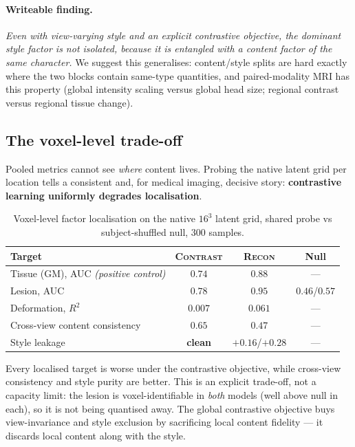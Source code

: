 \documentclass[11pt]{article}
\newcommand{\suspect}[1]{{\color{orange}#1}}
\begin{document}
\paragraph{Writeable finding.} \emph{Even with view-varying style and an explicit
contrastive objective, the dominant style factor is not isolated, because it is
entangled with a content factor of the same character.} We suggest this
generalises: content/style splits are hard exactly where the two blocks contain
same-type quantities, and paired-modality MRI has this property (global
intensity scaling versus global head size; regional contrast versus regional
tissue change).

\subsection{The voxel-level trade-off}
\label{sec:voxel}

Pooled metrics cannot see \emph{where} content lives. Probing the native latent
grid per location tells a consistent and, for medical imaging, decisive story:
\textbf{contrastive learning uniformly degrades localisation}.

\begin{table}[t]
\centering
\caption{Voxel-level factor localisation on the native $16^3$ latent grid,
shared probe vs subject-shuffled null, $300$ samples.}
\label{tab:voxel}
\begin{tabular}{lccc}
\toprule
Target & \textsc{Contrast} & \textsc{Recon} & Null \\
\midrule
Tissue (GM), AUC \emph{(positive control)} & $0.74$ & $\mathbf{0.88}$ & --- \\
Lesion, AUC & \suspect{$0.78$} & \suspect{$\mathbf{0.95}$} & $0.46$/$0.57$ \\
Deformation, $R^2$ & $0.007$ & $\mathbf{0.061}$ & --- \\
\midrule
Cross-view content consistency & $\mathbf{0.65}$ & $0.47$ & --- \\
Style leakage & \textbf{clean} & $+0.16$/$+0.28$ & --- \\
\bottomrule
\end{tabular}
\end{table}

Every localised target is worse under the contrastive objective, while
cross-view consistency and style purity are better. This is an explicit
trade-off, not a capacity limit: the lesion is voxel-identifiable in
\emph{both} models (well above null in each), so it is not being quantised away.
The global contrastive objective buys view-invariance and style exclusion by
sacrificing local content fidelity --- it discards local content along with the
style.
\end{document}
